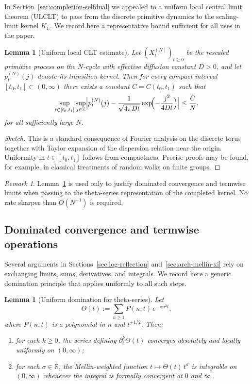 \documentclass[12pt]{amsart}
\newtheorem{lemma}[theorem]{Lemma}
\theoremstyle{definition}
\theoremstyle{remark}
\newtheorem{remark}[theorem]{Remark}
\begin{document}
In Section~\ref{sec:completion-selfdual} we appealed to a uniform local central limit theorem (ULCLT) to pass
from the discrete primitive dynamics to the scaling-limit kernel $K_L$. We record
here a representative bound sufficient for all uses in the paper.

\begin{lemma}[Uniform local CLT estimate]
\label{lem:ULCLT}
Let $(X_t^{(N)})_{t\ge0}$ be the rescaled primitive process on the $N$-cycle with
effective diffusion constant $D>0$, and let $p_t^{(N)}(j)$ denote its transition
kernel. Then for every compact interval $[t_0,t_1]\subset(0,\infty)$ there exists
a constant $C=C(t_0,t_1)$ such that
\[
\sup_{t\in[t_0,t_1]}\sup_{j\in\mathbb Z}
\Bigl|
p_t^{(N)}(j)
-
\frac{1}{\sqrt{4\pi Dt}}\exp\!\Bigl(-\frac{j^2}{4Dt}\Bigr)
\Bigr|
\le
\frac{C}{N},
\]
for all sufficiently large $N$.
\end{lemma}

\begin{proof}[Sketch]
This is a standard consequence of Fourier analysis on the discrete torus together
with Taylor expansion of the dispersion relation near the origin. Uniformity in
$t\in[t_0,t_1]$ follows from compactness. Precise proofs may be found, for example,
in classical treatments of random walks on finite groups.
\end{proof}

\begin{remark}
Lemma~\ref{lem:ULCLT} is used only to justify dominated convergence and termwise
limits when passing to the theta-series representation of the completed kernel.
No rate sharper than $O(N^{-1})$ is required.
\end{remark}

\subsection{Dominated convergence and termwise operations}
\label{app:dominated}

Several arguments in Sections~\ref{sec:log-reflection} and~\ref{sec:arch-mellin-xi} rely on exchanging limits, sums, derivatives,
and integrals. We record here a generic domination principle that applies uniformly
to all such steps.

\begin{lemma}[Uniform domination for theta-series]
\label{lem:theta-domination}
Let
\[
\Theta(t):=\sum_{n\ge1} P(n,t)\,e^{-\pi n^2 t},
\]
where $P(n,t)$ is a polynomial in $n$ and $t^{\pm1/2}$. Then:
\begin{enumerate}[label=(\roman*)]
\item for each $k\ge0$, the series defining $\partial_t^k\Theta(t)$ converges
absolutely and locally uniformly on $(0,\infty)$;
\item for each $\sigma\in\mathbb R$, the Mellin-weighted function
$t\mapsto \Theta(t)\,t^{\sigma}$ is integrable on $(0,\infty)$ whenever the integral
is formally convergent at $0$ and $\infty$.
\end{enumerate}
\end{lemma}
\end{document}
